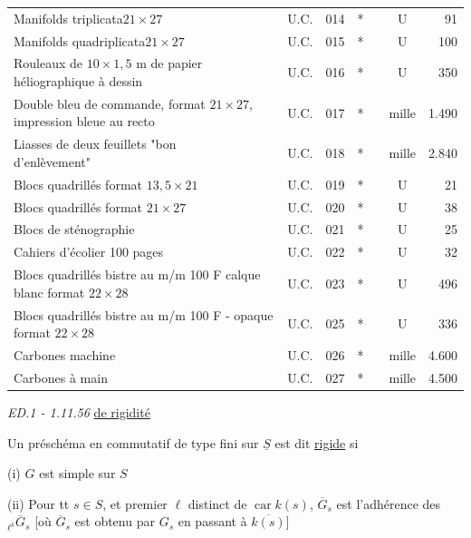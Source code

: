 {{\begin{tabular}{|l|c|r|c|c|c|r|}
Manifolds triplicata\qquad $21\!\times\!27$ & U.C. & 014 & * &  & U & 91 \\
Manifolds quadriplicata\quad $21\!\times\!27$ & U.C. & 015 & * &  & U & 100 \\
\shortstack[l]{Rouleaux de $10\!\times\!1{,}5$ m de papier\\héliographique à dessin} & U.C. & 016 & * &  & U & 350 \\
\shortstack[l]{Double bleu de commande, format\\$21\!\times\!27$, impression bleue au recto} & U.C. & \unsure{.} 017 & * &  & mille & 1.490 \\
\shortstack[l]{Liasses de deux feuillets "bon\\d'enlèvement"} & U.C. & 018 & * &  & mille & 2.840 \\
Blocs quadrillés format $13{,}5\!\times\!21$ & U.C. & 019 & * &  & U & 21 \\
Blocs quadrillés format $21\!\times\!27$ & U.C. & 020 & * &  & U & 38 \\
Blocs de sténographie & U.C. & 021 & * &  & U & 25 \\
Cahiers d'écolier 100 pages & U.C. & 022 & * &  & U & 32 \\
\shortstack[l]{Blocs quadrillés bistre au m/m\\100 F calque blanc format $22\!\times\!28$} & U.C. & 023 & * &  & U & 496 \\
\shortstack[l]{Blocs quadrillés bistre au m/m\\100 F - opaque format $22\!\times\!28$} & U.C. & 025 & * &  & U & 336 \\
Carbones machine & U.C. & 026 & * &  & mille & 4.600 \\
Carbones à main & U.C. & 027 & * &  & mille & 4.500 \\
\end{tabular}}}
\hfill\textit{ED.1 - 1.11.56}
\uline{ de rigidité}

 Un préschéma en  commutatif  de type fini sur $\underline S$ est dit \uline{rigide} si 

(i) $G$ est  simple sur $S$

(ii) Pour tt $s\in S$, et  premier $\ell$  distinct de $\operatorname{car} k(s)$, $\overline G_s$ est  l'adhérence des $ {}_{\ell^k}\overline G_s$ [où $\overline G_s$ est obtenu par $G_s$ en passant à  $\overline{k(s)}$]

